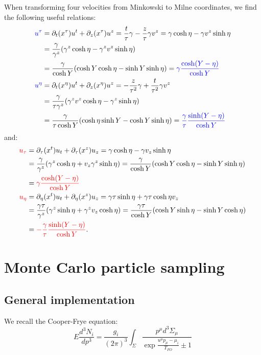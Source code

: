 \documentclass[12pt, a4paper]{report}
\begin{document}
When transforming four velocities from Minkowski to Milne coordinates, we find the following useful relations:
\begin{align}
{\color{blue}u^{\tau}}&=\partial_{t}(x^{\tau})u^t+\partial_{z}(x^{\tau})u^z=\frac{t}{\tau}\gamma-\frac{z}{\tau}\gamma v^z=\gamma \cosh \eta - \gamma v^z \sinh \eta\\
&=\dfrac{\gamma}{\gamma^z}(\gamma^z\cosh \eta - \gamma^z v^z \sinh \eta)\\
&=\dfrac{\gamma}{\cosh Y}(\cosh Y \cosh \eta - \sinh Y \sinh \eta)={\color{blue}\gamma \dfrac{\cosh(Y-\eta)}{\cosh Y}}\\
{\color{blue}u^{\eta}}&=\partial_{t}(x^{\eta})u^t+\partial_{z}(x^{\eta})u^z=-\frac{z}{\tau^2}\gamma+\frac{t}{\tau^2}\gamma v^z\\
&=\dfrac{\gamma}{\tau \gamma^z}(\gamma^z v^z \cosh \eta - \gamma^z \sinh \eta)\\
&=\dfrac{\gamma}{\tau \cosh Y}(\cosh \eta \sinh Y - \cosh Y \sinh \eta)={\color{blue}\dfrac{\gamma}{\tau} \dfrac{\sinh(Y-\eta)}{\cosh Y}}
\end{align}
and:
\begin{align}
{\color{red}u_{\tau}}&=\partial_{\tau}(x^t)u_t+\partial_{\tau}(x^z)u_z=\gamma \cosh \eta - \gamma v_z \sinh \eta\\
&=\dfrac{\gamma}{\gamma^z}(\gamma^z \cosh \eta + v_z \gamma^z \sinh \eta)=\dfrac{\gamma}{\cosh Y}(\cosh Y \cosh \eta - \sinh Y \sinh \eta)\\
&={\color{red}\gamma \dfrac{\cosh(Y-\eta)}{\cosh Y}}\\
{\color{red}u_{\eta}}&=\partial_{\eta}(x^t)u_t+\partial_{\eta}(x^z)u_z=\gamma\tau\sinh \eta + \gamma \tau \cosh \eta v_z\\
&=\dfrac{\gamma \tau}{\gamma^z}(\gamma^z \sinh \eta + \gamma^z v_z \cosh \eta)=
\dfrac{\gamma \tau}{\cosh Y}(\cosh Y \sinh \eta - \sinh Y \cosh \eta)\\
&={\color{red}-\dfrac{\gamma}{\tau} \dfrac{\sinh(Y-\eta)}{\cosh Y}}.
\end{align}


	
	\chapter{Monte Carlo particle sampling}
	\section{General implementation}
	We recall the Cooper-Frye equation:
	\begin{equation}
	E\dfrac{d^3 N_i}{dp^3}=\dfrac{g_i}{(2\pi)^3}\int_{\Sigma}\dfrac{p^{\mu} d^3\Sigma_{\mu}}{\exp{\frac{u^{\mu}p_{\mu}-\mu_i}{T_{FO}}\pm 1}}
	\end{equation}
	
\end{document}
